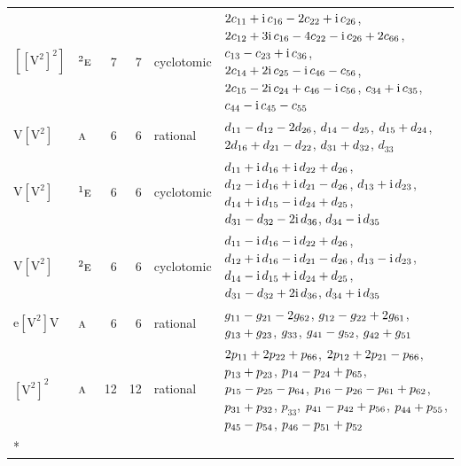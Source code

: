 \documentclass[10pt,a4paper]{article}
\numberwithin{equation}{section}
\newcommand{\irr}[1]{\text{\normalfont\scshape #1}}
\newcommand{\conjpair}[1]{{}^{#1}}
\newcommand{\iunit}{\mathrm{i}}
\newcommand{\jahn}[1]{\mathrm{#1}}
\newlength{\fillwidth}\newlength{\cellwidth}\newlength{\colwidth}
\newcommand{\signbreak}{\penalty100\relax}
\begin{document}
{\begin{longtable}{@{}llrrl>{\RaggedRight\arraybackslash}p{\fillwidth}@{}}
$\jahn{[[V^{2}]^{2}]}$ & $\conjpair{2}\irr{e}$ & 7 & 7 & cyclotomic & $2c_{11} +\signbreak \iunit{}\,c_{16} -\signbreak 2c_{22} +\signbreak \iunit{}\,c_{26}$, $2c_{12} +\signbreak 3\iunit{}\,c_{16} -\signbreak 4c_{22} -\signbreak \iunit{}\,c_{26} +\signbreak 2c_{66}$, $c_{13} -\signbreak c_{23} +\signbreak \iunit{}\,c_{36}$, $2c_{14} +\signbreak 2\iunit{}\,c_{25} -\signbreak \iunit{}\,c_{46} -\signbreak c_{56}$, $2c_{15} -\signbreak 2\iunit{}\,c_{24} +\signbreak c_{46} -\signbreak \iunit{}\,c_{56}$, $c_{34} +\signbreak \iunit{}\,c_{35}$, $c_{44} -\signbreak \iunit{}\,c_{45} -\signbreak c_{55}$\\
$\jahn{V[V^{2}]}$ & $\irr{a}$ & 6 & 6 & rational & $d_{11} -\signbreak d_{12} -\signbreak 2d_{26}$, $d_{14} -\signbreak d_{25}$, $d_{15} +\signbreak d_{24}$, $2d_{16} +\signbreak d_{21} -\signbreak d_{22}$, $d_{31} +\signbreak d_{32}$, $d_{33}$\\
$\jahn{V[V^{2}]}$ & $\conjpair{1}\irr{e}$ & 6 & 6 & cyclotomic & $d_{11} +\signbreak \iunit{}\,d_{16} +\signbreak \iunit{}\,d_{22} +\signbreak d_{26}$, $d_{12} -\signbreak \iunit{}\,d_{16} +\signbreak \iunit{}\,d_{21} -\signbreak d_{26}$, $d_{13} +\signbreak \iunit{}\,d_{23}$, $d_{14} +\signbreak \iunit{}\,d_{15} -\signbreak \iunit{}\,d_{24} +\signbreak d_{25}$, $d_{31} -\signbreak d_{32} -\signbreak 2\iunit{}\,d_{36}$, $d_{34} -\signbreak \iunit{}\,d_{35}$\\
$\jahn{V[V^{2}]}$ & $\conjpair{2}\irr{e}$ & 6 & 6 & cyclotomic & $d_{11} -\signbreak \iunit{}\,d_{16} -\signbreak \iunit{}\,d_{22} +\signbreak d_{26}$, $d_{12} +\signbreak \iunit{}\,d_{16} -\signbreak \iunit{}\,d_{21} -\signbreak d_{26}$, $d_{13} -\signbreak \iunit{}\,d_{23}$, $d_{14} -\signbreak \iunit{}\,d_{15} +\signbreak \iunit{}\,d_{24} +\signbreak d_{25}$, $d_{31} -\signbreak d_{32} +\signbreak 2\iunit{}\,d_{36}$, $d_{34} +\signbreak \iunit{}\,d_{35}$\\
$\jahn{e[V^{2}]V}$ & $\irr{a}$ & 6 & 6 & rational & $\mathnormal{g}_{11} -\signbreak \mathnormal{g}_{21} -\signbreak 2\mathnormal{g}_{62}$, $\mathnormal{g}_{12} -\signbreak \mathnormal{g}_{22} +\signbreak 2\mathnormal{g}_{61}$, $\mathnormal{g}_{13} +\signbreak \mathnormal{g}_{23}$, $\mathnormal{g}_{33}$, $\mathnormal{g}_{41} -\signbreak \mathnormal{g}_{52}$, $\mathnormal{g}_{42} +\signbreak \mathnormal{g}_{51}$\\
$\jahn{[V^{2}]^{2}}$ & $\irr{a}$ & 12 & 12 & rational & $2p_{11} +\signbreak 2p_{22} +\signbreak p_{66}$, $2p_{12} +\signbreak 2p_{21} -\signbreak p_{66}$, $p_{13} +\signbreak p_{23}$, $p_{14} -\signbreak p_{24} +\signbreak p_{65}$, $p_{15} -\signbreak p_{25} -\signbreak p_{64}$, $p_{16} -\signbreak p_{26} -\signbreak p_{61} +\signbreak p_{62}$, $p_{31} +\signbreak p_{32}$, $p_{33}$, $p_{41} -\signbreak p_{42} +\signbreak p_{56}$, $p_{44} +\signbreak p_{55}$, $p_{45} -\signbreak p_{54}$, $p_{46} -\signbreak p_{51} +\signbreak p_{52}$\\*

\end{longtable}}
\end{document}
